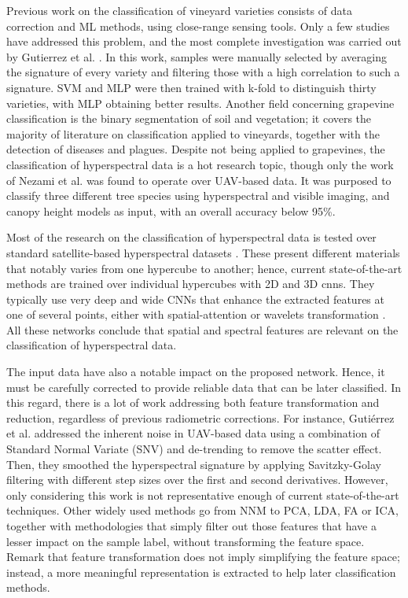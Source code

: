 Previous work on the classification of vineyard varieties consists of data correction and ML methods, using close-range sensing tools. Only a few studies have addressed this problem, and the most complete investigation was carried out by Gutierrez et al. \cite{gutierrez_--go_2018}. In this work, samples were manually selected by averaging the signature of every variety and filtering those with a high correlation to such a signature. SVM and MLP were then trained with k-fold to distinguish thirty varieties, with MLP obtaining better results. Another field concerning grapevine classification is the binary segmentation of soil and vegetation; it covers the majority of literature on classification applied to vineyards, together with the detection of diseases and plagues. Despite not being applied to grapevines, the classification of hyperspectral data is a hot research topic, though only the work of Nezami et al. \cite{nezami_tree_2020} was found to operate over UAV-based data. It was purposed to classify three different tree species using hyperspectral and visible imaging, and canopy height models as input, with an overall accuracy below 95\%.

Most of the research on the classification of hyperspectral data is tested over standard satellite-based hyperspectral datasets \cite{m_grana_hyperspectral_nodate}. These present different materials that notably varies from one hypercube to another; hence, current state-of-the-art methods are trained over individual hypercubes with 2D and 3D \acrshort{cnn}s. They typically use very deep and wide CNNs \cite{moraga_jigsawhsi_2022} that enhance the extracted features at one of several points, either with spatial-attention \cite{xue_attention-based_2021, roy_attention-based_2021} or wavelets transformation \cite{chakraborty_spectralnet_2021}. All these networks conclude that spatial and spectral features are relevant on the classification of hyperspectral data.

The input data have also a notable impact on the proposed network. Hence, it must be carefully corrected to provide reliable data that can be later classified. In this regard, there is a lot of work addressing both feature transformation and reduction, regardless of previous radiometric corrections. For instance, Gutiérrez et al. \cite{gutierrez_--go_2018} addressed the inherent noise in UAV-based data using a combination of Standard Normal Variate (SNV) and de-trending to remove the scatter effect. Then, they smoothed the hyperspectral signature by applying Savitzky-Golay filtering with different step sizes over the first and second derivatives. However, only considering this work is not representative enough of current state-of-the-art techniques. Other widely used methods go from NNM to PCA, LDA, FA or ICA, together with methodologies that simply filter out those features that have a lesser impact on the sample label, without transforming the feature space. Remark that feature transformation does not imply simplifying the feature space; instead, a more meaningful representation is extracted to help later classification methods. 

